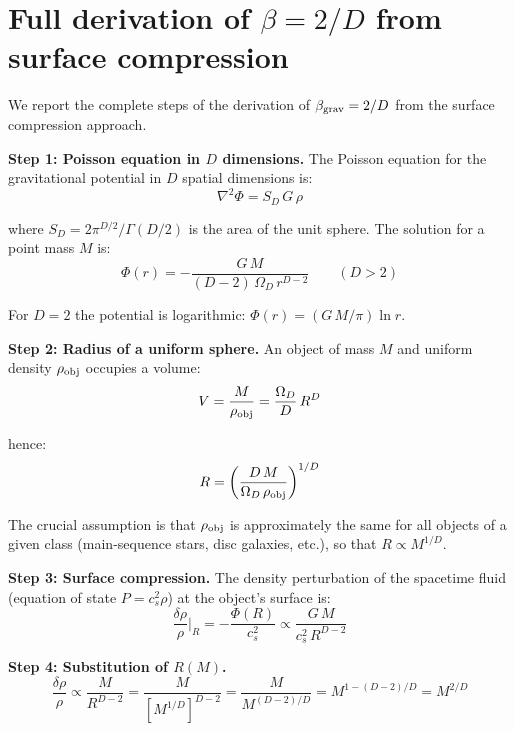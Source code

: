 \documentclass[10pt,a4paper]{article}
\begin{document}
\appendix

\section{Full derivation of $\beta = 2/D$ from surface compression}\label{app:surface}

We report the complete steps of the derivation of $\beta_{\rm grav} = 2/D$ from the surface compression approach.

\textbf{Step 1: Poisson equation in $D$ dimensions.} The Poisson equation for the gravitational potential in $D$ spatial dimensions is:
\begin{equation}
\nabla^2 \Phi = S_D\, G\, \rho
\end{equation}

where $S_D = 2\pi^{D/2}/\Gamma(D/2)$ is the area of the unit sphere. The solution for a point mass $M$ is:
\begin{equation}
\Phi(r) = -\frac{G\,M}{(D-2)\,\Omega_D\,r^{D-2}} \qquad (D > 2)
\end{equation}

For $D = 2$ the potential is logarithmic: $\Phi(r) = (G\,M/\pi)\ln r$.

\textbf{Step 2: Radius of a uniform sphere.} An object of mass $M$ and uniform density $\rho_{\rm obj}$ occupies a volume:
\begin{equation}
V = \frac{M}{\rho_{\rm obj}} = \frac{\Omega_D}{D}\,R^D
\end{equation}

hence:
\begin{equation}
R = \left(\frac{D\,M}{\Omega_D\,\rho_{\rm obj}}\right)^{1/D}
\end{equation}

The crucial assumption is that $\rho_{\rm obj}$ is approximately the same for all objects of a given class (main-sequence stars, disc galaxies, etc.), so that $R \propto M^{1/D}$.

\textbf{Step 3: Surface compression.} The density perturbation of the spacetime fluid (equation of state $P = c_s^2\rho$) at the object's surface is:
\begin{equation}
\frac{\delta\rho}{\rho}\bigg|_R = -\frac{\Phi(R)}{c_s^2} \propto \frac{G\,M}{c_s^2\,R^{D-2}}
\end{equation}

\textbf{Step 4: Substitution of $R(M)$.}
\begin{equation}
\frac{\delta\rho}{\rho} \propto \frac{M}{R^{D-2}} = \frac{M}{[M^{1/D}]^{D-2}} = \frac{M}{M^{(D-2)/D}} = M^{1-(D-2)/D} = M^{2/D}
\end{equation}
\end{document}
